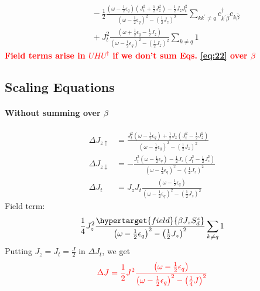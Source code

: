 \documentclass[14pt]{extarticle}
\newcommand{\qs}[1]{\textbf{{\textcolor{red}{#1}}}}
\numberwithin{equation}{section}
\begin{document}
\begin{subequations}
\begin{align}
&\hspace{30pt} - \frac{1}{2} \frac{\left( \omega -\frac{1}{2}\epsilon_q  \right) \left( J_t^2 + \frac{1}{2} J_z^2 \right) - \frac{1}{2} J_zJ_t^2}{\left( \omega -\frac{1}{2}\epsilon_q  \right)^2 - \left( \frac{1}{2}J_z \right)^2} \sum\limits_{kk^{\prime}\ne q} c^{\dag}_{k^{\prime}\bar{\beta}} c_{k\bar{\beta}}  \nonumber\\
                                                                                         &\hspace{30pt} + J_t^2 \frac{\left( \omega + \frac{1}{2}\epsilon_q - \frac{1}{2} J_z \right)}{\left( \omega -\frac{1}{2}\epsilon_q  \right)^2 - \left( \frac{1}{2}J_z \right)^2} \sum\limits_{k\ne q} 1 \label{eq:19} 
\end{align}
\end{subequations}
\hypertarget{q2}{\qs{Field terms arise in $U HU^{\dag}$ if we don't sum Eqs. \eqref{eq:22} over $\beta$}}

\subsection{Scaling Equations}
\paragraph{Without summing over \(\beta\)}
\begin{equation}\begin{aligned}
	\Delta J_{z \uparrow} &= \frac{J_t^2 \left( \omega - \frac{1}{2}\epsilon_q \right)+ \frac{1}{2} J_z \left( J_t^2 - \frac{1}{2}J_z^2 \right)}{\left( \omega -\frac{1}{2}\epsilon_q  \right)^2 - \left( \frac{1}{2}J_z \right)^2}\\
	\Delta J_{z \downarrow} &= -\frac{J_t^2 \left( \omega - \frac{1}{2}\epsilon_q \right) - \frac{1}{2} J_z \left( J_t^2 - \frac{1}{2}J_z^2 \right)}{\left( \omega -\frac{1}{2}\epsilon_q  \right)^2 - \left( \frac{1}{2}J_z \right)^2}\\
	\Delta J_t &= J_zJ_t \frac{\left( \omega -\frac{1}{2}\epsilon_q  \right)}{\left( \omega -\frac{1}{2}\epsilon_q  \right)^2 - \left( \frac{1}{2}J_z \right)^2}
\end{aligned}\end{equation}
{\color{red}Field term:}
\begin{equation}\begin{aligned}
\frac{1}{4} J_z^2 \frac{\hypertarget{field}{\beta J_z S_d^z}}{\left( \omega -\frac{1}{2}\epsilon_q  \right)^2 - \left( \frac{1}{2}J_z \right)^2} \sum\limits_{k\ne q} 1
\end{aligned}\end{equation}
Putting \(J_z = J_t = \frac{J}{2}\) in \(\Delta J_t\), we get
\hypertarget{q4}{\begin{align}
	\label{q4}
	\color{red}{\Delta J = \frac{1}{2}J^2 \frac{\left( \omega - \frac{1}{2}\epsilon_q \right)}{\left( \omega - \frac{1}{2}\epsilon_q \right)^2 - \left( \frac{1}{4} J \right)^2}}
\end{align}}
\end{document}
